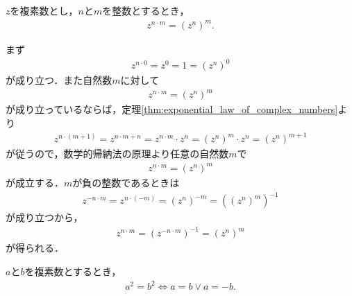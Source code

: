 	\begin{screen}
		\begin{thm}
		\label{thm:exponential_law_of_complex_numbers_2}
			$z$を複素数とし，$n$と$m$を整数とするとき，
			\begin{align}
				z^{n \cdot m} = (z^n)^m.
			\end{align}
		\end{thm}
	\end{screen}
	
	\begin{sketch}
		まず
		\begin{align}
			z^{n \cdot 0} = z^{0} = 1 = (z^n)^0 
		\end{align}
		が成り立つ．また自然数$m$に対して
		\begin{align}
			z^{n \cdot m} = (z^n)^m
		\end{align}
		が成り立っているならば，定理\ref{thm:exponential_law_of_complex_numbers}より
		\begin{align}
			z^{n \cdot (m + 1)} = z^{n \cdot m + n}
			= z^{n \cdot m} \cdot z^n
			= (z^n)^m \cdot z^n
			= (z^n)^{m+1}
		\end{align}
		が従うので，数学的帰納法の原理より任意の自然数$m$で
		\begin{align}
			z^{n \cdot m} = (z^n)^m
		\end{align}
		が成立する．$m$が負の整数であるときは
		\begin{align}
			z^{-n \cdot m} = z^{n \cdot (-m)} = (z^{n})^{-m} = ((z^{n})^{m})^{-1}
		\end{align}
		が成り立つから，
		\begin{align}
			z^{n \cdot m} = (z^{-n \cdot m})^{-1} = (z^{n})^{m}
		\end{align}
		が得られる．
		\QED
	\end{sketch}
	
	\begin{screen}
		\begin{thm}[二乗が等しい数同士は一致するか逆元である]
		\label{thm:numbers_whose_squares_are_coincide_are_same_or_inverse}
			$a$と$b$を複素数とするとき，
			\begin{align}
				a^2 = b^2 \Longleftrightarrow 
				a = b \vee a = -b.
			\end{align}
		\end{thm}
	\end{screen}
	
